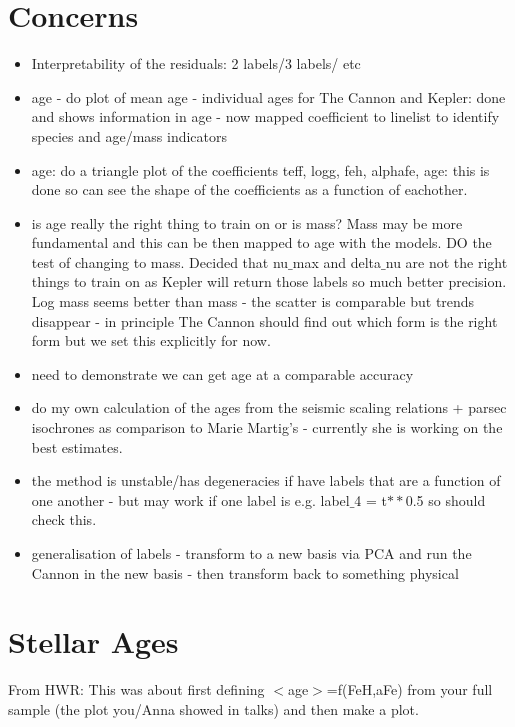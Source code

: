 \documentclass[11pt]{amsart}
\begin{document}
\section{Concerns}
\begin{itemize}
\item Interpretability of the residuals: 2 labels/3 labels/ etc
\item age - do plot of mean age - individual ages for The Cannon and Kepler: done and shows information in age - now mapped coefficient to linelist to identify species and age/mass indicators \\
\item age: do a triangle plot of the coefficients teff, logg, feh, alphafe, age: this is done so can see the shape of the coefficients as a function of eachother. \\ 
\item is age really the right thing to train on or is mass? Mass may be more fundamental and this can be then mapped to age with the models. DO the test of changing to mass. Decided that nu$\_$max and delta$\_$nu are not the right things to train on as Kepler will return those labels so much better precision. Log mass seems better than mass - the scatter is comparable but trends disappear - in principle The Cannon should find out which form is the right form but we set this explicitly for now. 
\item need to demonstrate we can get age at a comparable accuracy
\item  do my own calculation of the ages from the seismic scaling relations + parsec isochrones as comparison to Marie Martig's - currently she is working on the best estimates. 
\item the method is unstable/has degeneracies if have labels that are a function of one another - but may work if one label is e.g. label$\_$4 = t$**$0.5 so should check this. 
\item generalisation of labels - transform to a new basis via PCA and run the Cannon in the new basis - then transform back to something physical 
\end{itemize} 

\section{Stellar Ages}

 From HWR: This was about first defining $<$age$>$=f(FeH,aFe) from your full
 sample (the plot you/Anna showed in talks) and
 then make a plot. 
 
\end{document}

